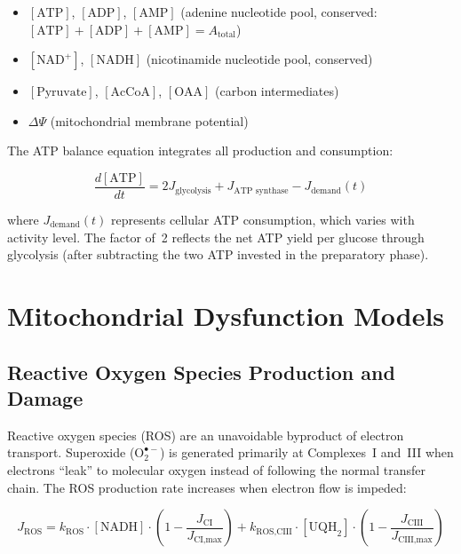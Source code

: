 \begin{itemize}
    \item $[\text{ATP}]$, $[\text{ADP}]$, $[\text{AMP}]$ (adenine nucleotide pool, conserved: $[\text{ATP}] + [\text{ADP}] + [\text{AMP}] = A_{\text{total}}$)
    \item $[\text{NAD}^+]$, $[\text{NADH}]$ (nicotinamide nucleotide pool, conserved)
    \item $[\text{Pyruvate}]$, $[\text{AcCoA}]$, $[\text{OAA}]$ (carbon intermediates)
    \item $\Delta\Psi$ (mitochondrial membrane potential)
\end{itemize}

The ATP balance equation integrates all production and consumption:

\begin{equation}
\label{eq:atp-balance}
\frac{d[\text{ATP}]}{dt} = 2 J_{\text{glycolysis}} + J_{\text{ATP synthase}} - J_{\text{demand}}(t)
\end{equation}

where $J_{\text{demand}}(t)$ represents cellular ATP consumption, which varies with activity level. The factor of~2 reflects the net ATP yield per glucose through glycolysis (after subtracting the two ATP invested in the preparatory phase).

\section{Mitochondrial Dysfunction Models}
\label{sec:mitochondrial-dysfunction-models}

\subsection{Reactive Oxygen Species Production and Damage}
\label{sec:ros-model}

Reactive oxygen species (ROS) are an unavoidable byproduct of electron transport. Superoxide ($\text{O}_2^{\bullet-}$) is generated primarily at Complexes~I and~III when electrons ``leak'' to molecular oxygen instead of following the normal transfer chain. The ROS production rate increases when electron flow is impeded:

\begin{equation}
\label{eq:ros-production}
J_{\text{ROS}} = k_{\text{ROS}} \cdot [\text{NADH}] \cdot \left(1 - \frac{J_{\text{CI}}}{J_{\text{CI,max}}}\right) + k_{\text{ROS,CIII}} \cdot [\text{UQH}_2] \cdot \left(1 - \frac{J_{\text{CIII}}}{J_{\text{CIII,max}}}\right)
\end{equation}

